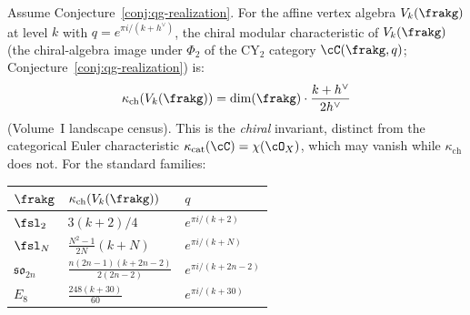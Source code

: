 \begin{proposition}
\label{prop:kappa-cat-quantum-groups}
Assume Conjecture~\ref{conj:qg-realization}. For the affine vertex
algebra $V_k(\frakg)$ at level $k$ with
$q = e^{\pi i/(k + h^\vee)}$, the chiral modular characteristic of
$V_k(\frakg)$ (the chiral-algebra image under $\Phi_2$ of the CY$_2$
category $\cC(\frakg, q)$; Conjecture~\ref{conj:qg-realization}) is:
\[
 \kappa_{\mathrm{ch}}(V_k(\frakg))
 = \dim(\frakg) \cdot \frac{k + h^\vee}{2h^\vee}
\]
(Volume~I landscape census). This is the \emph{chiral} invariant,
distinct from the categorical Euler characteristic
$\kappa_{\mathrm{cat}}(\cC) = \chi(\cO_X)$, which may vanish while
$\kappa_{\mathrm{ch}}$ does not. For the standard families:
\begin{center}
\renewcommand{\arraystretch}{1.3}
\begin{tabular}{lll}
 \toprule
 $\frakg$ & $\kappa_{\mathrm{ch}}(V_k(\frakg))$ & $q$ \\
 \midrule
 $\fsl_2$ & $3(k+2)/4$ & $e^{\pi i/(k+2)}$ \\
 $\fsl_N$ & $\frac{N^2-1}{2N}(k+N)$ & $e^{\pi i/(k+N)}$ \\
 $\mathfrak{so}_{2n}$ & $\frac{n(2n-1)(k+2n-2)}{2(2n-2)}$
 & $e^{\pi i/(k+2n-2)}$ \\
 $E_8$ & $\frac{248(k+30)}{60}$
 & $e^{\pi i/(k+30)}$ \\
 \bottomrule
\end{tabular}
\end{center}
\end{proposition}

